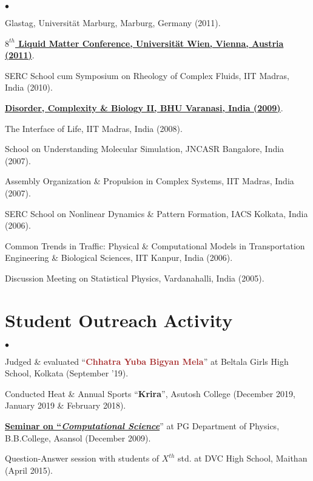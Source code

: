 \documentclass[margin,line]{res}
\newenvironment{list2}{
  \begin{list}{$\bullet$}{%
      \setlength{\itemsep}{0in}
      \setlength{\parsep}{0in} \setlength{\parskip}{0in}
      \setlength{\topsep}{0in} \setlength{\partopsep}{0in} 
      \setlength{\leftmargin}{0.2in}}}{\end{list}}
\begin{document}
\begin{resume}
\begin{list2}
\item Glastag, Universit\"at Marburg, Marburg, Germany (2011).
\item \href{https://www.slideshare.net/AmitBhattacharjee14/poster-lmc-wien-2011-on-colloidal-glassy-rheology}{\bf $8^{th}$ Liquid Matter 
      Conference, Universit\"at Wien, Vienna, Austria (2011)}.
\item SERC School cum Symposium on Rheology of Complex Fluids, IIT Madras, India (2010).
\item \href{http://www.slideshare.net/AmitBhattacharjee14/textures-and-topological-defects-in-nematic-phases}{\bf Disorder, Complexity 
      \& Biology II, BHU Varanasi, India (2009)}.
\item The Interface of Life, IIT Madras, India (2008). 
\item School on Understanding Molecular Simulation, JNCASR Bangalore, India (2007). 
\item Assembly Organization \& Propulsion in Complex Systems, IIT Madras, India (2007). 
\item SERC School on Nonlinear Dynamics \& Pattern Formation, IACS Kolkata, India (2006). 
\item Common Trends in Traffic: Physical \& Computational Models in Transportation Engineering \& Biological Sciences, IIT Kanpur, India (2006). 
\item Discussion Meeting on Statistical Physics, Vardanahalli, India (2005).

\section{\sc Student Outreach Activity}
\begin{list2}
\item Judged \& evaluated ``\textcolor{brown}{\sf \bf Chhatra Yuba Bigyan Mela}'' at Beltala Girls High School, 
      Kolkata (September '19).  
\item Conducted Heat \& Annual Sports ``\textcolor{auburn}{\sc \bf Krira}'', Asutosh College (December 2019, January 2019 \& February 2018).
\item \href{https://www.slideshare.net/AmitBhattacharjee14/computational-liquid-crystal-physics}{\bf Seminar on 
      ``\textcolor{skblue}{\it Computational Science}}'' at PG Department of Physics, B.B.College, Asansol (December 2009).
\item Question-Answer session with students of $X^{th}$ std. at DVC High School, Maithan (April 2015).
\end{list2}


\end{list2}
\end{resume}
\end{document}
